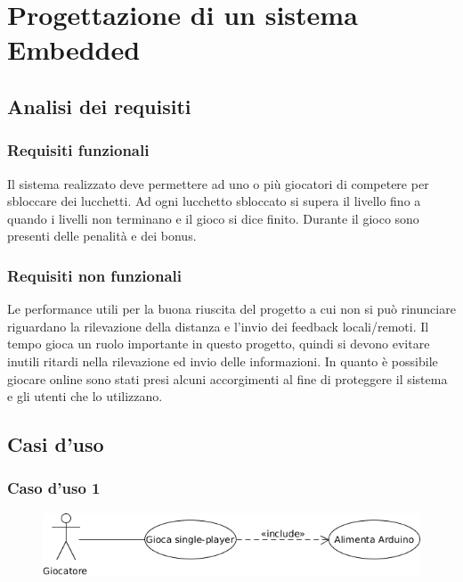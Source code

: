 \chapter{Progettazione di un sistema Embedded}
\section{Analisi dei requisiti}
\subsection{Requisiti funzionali}
Il sistema realizzato deve permettere ad uno o più giocatori di competere per sbloccare dei lucchetti. Ad ogni lucchetto sbloccato si supera il livello fino a quando i livelli non terminano e il gioco si dice finito. Durante il gioco sono presenti delle penalità e dei bonus.

\subsection{Requisiti non funzionali}
Le performance utili per la buona riuscita del progetto a cui non si può rinunciare riguardano la rilevazione della distanza e l'invio dei feedback locali/remoti.
Il tempo gioca un ruolo importante in questo progetto, quindi si devono evitare inutili ritardi nella rilevazione ed invio delle informazioni.
In quanto è possibile giocare online sono stati presi alcuni accorgimenti al fine di proteggere il sistema e gli utenti che lo utilizzano.

\clearpage
\section{Casi d'uso}
\subsection{Caso d'uso 1}

\begin{figure}[h]
	\centering
	\includegraphics[scale=.6]{img/UML/UseCases/case1.png}
\end{figure}

